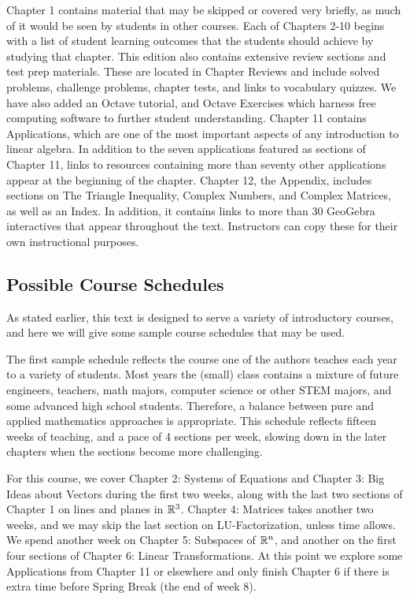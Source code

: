 \documentclass{ximera}
\begin{document}
Chapter 1 contains material that may be skipped or covered very briefly, as much of it would be seen by students in other courses.  Each of Chapters 2-10 begins with a list of student learning outcomes that the students should achieve by studying that chapter.  This edition also contains extensive review sections and test prep materials.  These are located in Chapter Reviews and include solved problems, challenge problems, chapter tests, and links to vocabulary quizzes.  We have also added an Octave tutorial, and Octave Exercises which harness free computing software to further student understanding.  Chapter 11 contains Applications, which are one of the most important aspects of any introduction to linear algebra.  In addition to the seven applications featured as sections of Chapter 11, links to resources containing more than seventy other applications appear at the beginning of the chapter.  Chapter 12, the Appendix, includes sections on The Triangle Inequality, Complex Numbers, and Complex Matrices, as well as an Index.  In addition, it contains links to more than 30 GeoGebra interactives that appear throughout the text.  Instructors can copy these for their own instructional purposes.

\subsection*{Possible Course Schedules}

As stated earlier, this text is designed to serve a variety of introductory courses, and here we will give some sample course schedules that may be used.

The first sample schedule reflects the course one of the authors teaches each year to a variety of students.  Most years the (small) class contains a mixture of future engineers, teachers, math majors, computer science or other STEM majors, and some advanced high school students.  Therefore, a balance between pure and applied mathematics approaches is appropriate.  This schedule reflects fifteen weeks of teaching, and a pace of 4 sections per week, slowing down in the later chapters when the sections become more challenging.  

For this course, we cover Chapter 2: Systems of Equations and Chapter 3: Big Ideas about Vectors during the first two weeks, along with the last two sections of Chapter 1 on lines and planes in $\mathbb{R}^3$.  Chapter 4: Matrices takes another two weeks, and we may skip the last section on LU-Factorization, unless time allows.  We spend another week on Chapter 5: Subspaces of $\mathbb{R}^n$, and another on the first four sections of Chapter 6: Linear Transformations.  At this point we explore some Applications from Chapter 11 or elsewhere and only finish Chapter 6 if there is extra time before Spring Break (the end of week 8).
\end{document}
